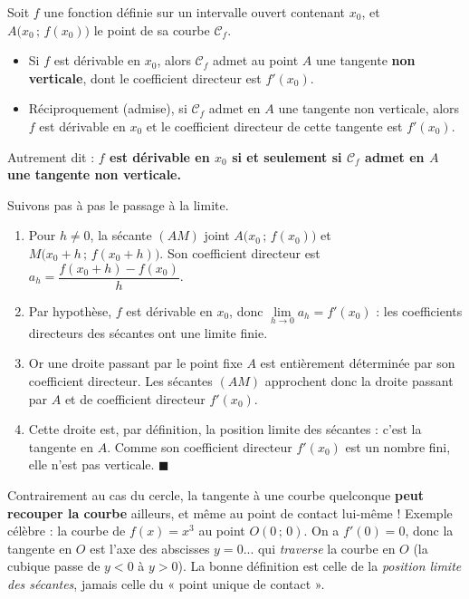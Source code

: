 \documentclass[11pt]{article}
\newcommand{\cle}[1]{{\popxbold\color{popdark}#1}}
\begin{document}
\begin{propriete}
Soit $f$ une fonction définie sur un intervalle ouvert contenant $x_0$, et $A\bigl(x_0 \,;\, f(x_0)\bigr)$ le point de sa courbe $\mathcal{C}_f$.
\begin{itemize}
\item Si $f$ est \cle{dérivable en} $x_0$, alors $\mathcal{C}_f$ admet au point $A$ une tangente \textbf{non verticale}, dont le coefficient directeur est $f'(x_0)$.
\item Réciproquement (admise), si $\mathcal{C}_f$ admet en $A$ une tangente non verticale, alors $f$ est dérivable en $x_0$ et le coefficient directeur de cette tangente est $f'(x_0)$.
\end{itemize}
Autrement dit : \textbf{$f$ est dérivable en $x_0$ si et seulement si $\mathcal{C}_f$ admet en $A$ une tangente non verticale.}
\end{propriete}

\begin{experience}
Suivons pas à pas le passage à la limite.
\begin{enumerate}
\item Pour $h \neq 0$, la sécante $(AM)$ joint $A\bigl(x_0\,;\,f(x_0)\bigr)$ et $M\bigl(x_0+h\,;\,f(x_0+h)\bigr)$. Son coefficient directeur est $a_h = \dfrac{f(x_0+h)-f(x_0)}{h}$.
\item Par hypothèse, $f$ est dérivable en $x_0$, donc $\lim\limits_{h \to 0} a_h = f'(x_0)$ : les coefficients directeurs des sécantes ont une limite finie.
\item Or une droite passant par le point fixe $A$ est entièrement déterminée par son coefficient directeur. Les sécantes $(AM)$ approchent donc la droite passant par $A$ et de coefficient directeur $f'(x_0)$.
\item Cette droite est, par définition, la position limite des sécantes : c'est la tangente en $A$. Comme son coefficient directeur $f'(x_0)$ est un nombre fini, elle n'est pas verticale. $\blacksquare$
\end{enumerate}
\end{experience}

\begin{attention}
Contrairement au cas du cercle, la tangente à une courbe quelconque \textbf{peut recouper la courbe} ailleurs, et même au point de contact lui-même ! Exemple célèbre : la courbe de $f(x) = x^3$ au point $O(0\,;\,0)$. On a $f'(0) = 0$, donc la tangente en $O$ est l'axe des abscisses $y = 0$... qui \emph{traverse} la courbe en $O$ (la cubique passe de $y<0$ à $y>0$). La bonne définition est celle de la \emph{position limite des sécantes}, jamais celle du « point unique de contact ».
\end{attention}
\end{document}
